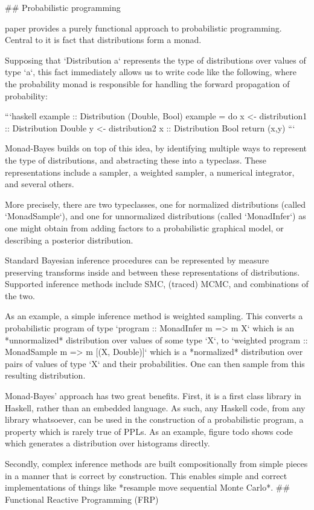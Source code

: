 ## Probabilistic programming

paper
  provides a purely functional approach to probabilistic programming. Central to it is fact that distributions form a monad.

Supposing that `Distribution a` represents the type of distributions over values of type `a`, this fact immediately allows us to write code like the following, where the probability monad is responsible for handling the forward propagation of probability:

```haskell
example :: Distribution (Double, Bool)
example = do
    x <- distribution1 :: Distribution Double
    y <- distribution2 x :: Distribution Bool
    return (x,y)
```

Monad-Bayes builds on top of this idea, by identifying multiple ways to represent the type of distributions, and abstracting these into a typeclass. These representations include a sampler, a weighted sampler, a numerical integrator, and several others.

More precisely, there are two typeclasses, one for normalized distributions (called `MonadSample`), and one for unnormalized distributions (called `MonadInfer`) as one might obtain from adding factors to a probabilistic graphical model, or describing a posterior distribution.

Standard Bayesian inference procedures can be represented by measure preserving transforms inside and between these representations of distributions. Supported inference methods include SMC, (traced) MCMC, and combinations of the two. 

As an example, a simple inference method is weighted sampling. This converts a probabilistic program of type `program :: MonadInfer m => m X` which is an *unnormalized* distribution over values of some type `X`, to `weighted program :: MonadSample m => m [(X, Double)]` which is a *normalized* distribution over pairs of values of type `X` and their probabilities. One can then sample from this resulting distribution. 

Monad-Bayes' approach has two great benefits. First, it is a first class library in Haskell, rather than an embedded language. As such, any Haskell code, from any library whatsoever, can be used in the construction of a probabilistic program, a property which is rarely true of PPLs. As an example, figure todo shows code which generates a distribution over histograms directly.

Secondly, complex inference methods are built compositionally from simple pieces in a manner that is correct by construction. This enables simple and correct implementations of things like *resample move sequential Monte Carlo*.
## Functional Reactive Programming (FRP)

